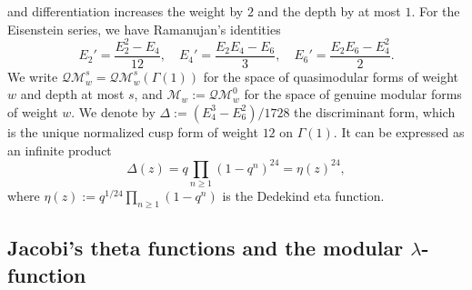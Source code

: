 \documentclass[10pt,reqno]{amsproc}
\newcommand{\QM}{\mathcal{QM}}
\newcommand{\cM}{\mathcal{M}}
\newcommand{\1}{\mathds{1}}	%
\theoremstyle{definition}
\theoremstyle{remark}
\begin{document}
and differentiation increases the weight by $2$ and the depth by at most $1$.
For the Eisenstein series, we have Ramanujan's identities \cite{bruinier2008elliptic}
\begin{equation}
    \label{eqn:ramanujan}
    E_2' = \frac{E_2^2 - E_4}{12}, \quad
    E_4' = \frac{E_2E_4 - E_6}{3}, \quad
    E_6' = \frac{E_2 E_6 - E_4^2}{2}.
\end{equation}
We write $\QM_{w}^{s} = \QM_{w}^{s}(\Gamma(1))$ for the space of quasimodular forms of weight $w$ and depth at most $s$, and $\cM_{w} := \QM_{w}^{0}$ for the space of genuine modular forms of weight $w$.
We denote by $\Delta := (E_4^3 - E_6^2) / 1728$ the discriminant form, which is the unique normalized cusp form of weight $12$ on $\Gamma(1)$.
It can be expressed as an infinite product
\[
\Delta(z) = q \prod_{n \ge 1} (1 - q^n)^{24} = \eta(z)^{24},
\]
where $\eta(z) := q^{1/24} \prod_{n \ge 1} (1 - q^n)$ is the Dedekind eta function.


\subsection{Jacobi's theta functions and the modular $\lambda$-function}
\end{document}
